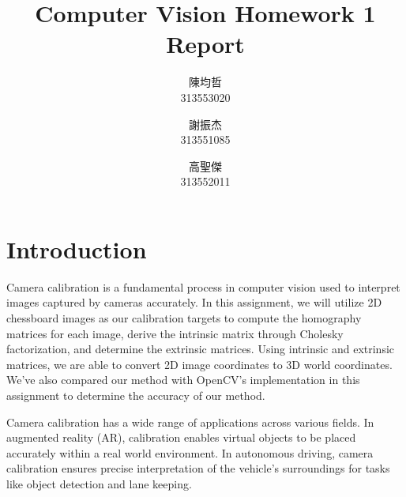 \documentclass[12pt,letterpaper]{article}
\begin{document}
\begin{CJK}{UTF8}{bkai}
    \title{Computer Vision Homework 1 Report}

    \author{
        陳均哲 \\
        313553020\\
        \and
        謝振杰\\
        313551085\\
        \and
        高聖傑\\
        313552011\\
    }

    \maketitle
\end{CJK}

\section{Introduction}
\label{sec:intro}
Camera calibration is a fundamental process in computer vision used to interpret images captured by cameras accurately. In this assignment, we will utilize 2D chessboard images as our calibration targets to compute the homography matrices for each image, derive the intrinsic matrix through Cholesky factorization, and determine the extrinsic matrices. Using intrinsic and extrinsic matrices, we are able to convert 2D image coordinates to 3D world coordinates. We've also compared our method with OpenCV's implementation in this assignment to determine the accuracy of our method.

Camera calibration has a wide range of applications across various fields. In augmented reality (AR), calibration enables virtual objects to be placed accurately within a real world environment. In autonomous driving, camera calibration ensures precise interpretation of the vehicle's surroundings for tasks like object detection and lane keeping.
\end{document}
